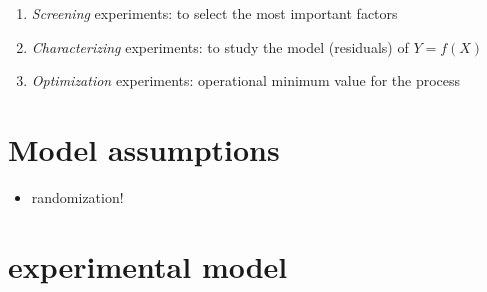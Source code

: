 \documentclass[
  a4paper,
]{scrbook}
\providecommand{\tightlist}{%
  \setlength{\itemsep}{0pt}\setlength{\parskip}{0pt}}\usepackage{longtable,booktabs,array}
\begin{document}
\begin{enumerate}
\def\labelenumi{\arabic{enumi}.}
\tightlist
\item
  \emph{Screening} experiments: to select the most important factors
\item
  \emph{Characterizing} experiments: to study the model (residuals) of
  \(Y = f(X)\)
\item
  \emph{Optimization} experiments: operational minimum value for the
  process
\end{enumerate}

\section{Model assumptions}\label{model-assumptions}

\begin{itemize}
\tightlist
\item
  randomization!
\end{itemize}

\begin{table}

\caption{\label{tbl-dm-rnd}The randomized design matrix for experimental
runs}


\end{table}%

\section{experimental model}\label{experimental-model}
\end{document}
